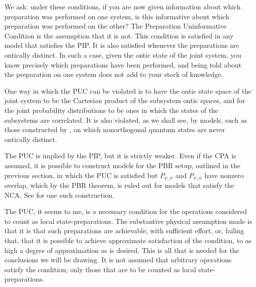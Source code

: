 \documentclass[12pt]{article}
\begin{document}
We ask: under these conditions, if you are now given information about which preparation was performed on one system, is this  informative about which preparation was performed on the other? The Preparation Uninformative Condition is the assumption that it is not.   This condition is satisfied in any model that satisfies the PIP. It is also satisfied whenever the preparations are ontically distinct. In such a case, given the ontic state of the joint system, you know precisely which preparations have been performed, and being told about the preparation on one system does not add to your stock of knowledge.

One way in which the PUC can be violated is to have the ontic state space of the joint system to be the Cartesian product of the subsystem ontic spaces, and for the joint probability distributions to be ones in which the states of the subsystems are correlated.  It is also violated, as we shall see, by models, such as those constructed by \citet{ABCL}, on which nonorthogonal quantum states are never ontically distinct.

The PUC is implied by the PIP, but it is strictly weaker.  Even if the CPA is assumed, it is possible to construct models for the PBR setup, outlined in the previous section, in which the PUC is satisfied but $P_{\psi, \psi}$ and $P_{\psi, \phi}$ have nonzero overlap, which by the PBR theorem, is ruled out for models that satisfy the NCA. See \citet{MyrvoldPsiOnt} for one such construction.

The PUC, it seems to me, is a necessary condition for the operations considered to count as local state-preparations.  The substantive physical assumption made is that it is that such preparations are achievable, with  sufficient effort, or, failing that, that it is possible to achieve approximate satisfaction of the condition, to as high a degree of approximation as is desired.  This is all that is needed for the conclusions we will be drawing. It is not assumed that arbitrary operations satisfy the condition; only those that are to be counted as local state-preparations.
\end{document}
